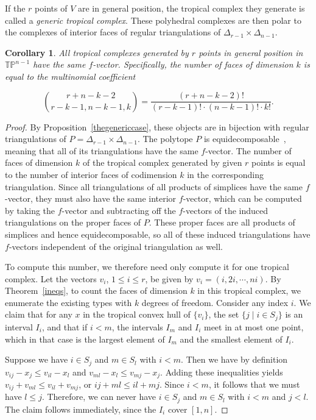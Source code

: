 \documentclass[11pt]{amsart}
\newtheorem{cor}[thm]{Corollary}
\newcommand{\TP}{\mathbb{TP}}
\newcommand{\bin}[2]{{#1\choose #2}}
\begin{document}
If the $r$ points of $V$ are in general position, the tropical complex they generate is 
called a 
\emph{generic tropical complex}.
These polyhedral complexes are then polar to the complexes of interior faces of regular
triangulations of $\Delta_{r-1}\times \Delta_{n-1}$.

\begin{cor}
All tropical complexes generated by $r$ points in general position in $\TP^{n-1}$ have the same 
$f$-vector. 
Specifically, the
number of faces of dimension $k$ is equal to the multinomial coefficient

\[
\bin{r+n-k-2}{r-k-1, n-k-1, k} = \frac{(r+n-k-2)!}{(r-k-1)!\cdot (n-k-1)!\cdot k!}.
\]
\end{cor}

\begin{proof}

By Proposition~\ref{thegenericcase}, these objects are in bijection with regular triangulations of
$P=\Delta_{r-1}\times \Delta_{n-1}$.  The polytope $P$ is equidecomposable~\cite{BCS}, meaning that all of
its triangulations have the same $f$-vector. The number of faces of dimension $k$ of the tropical complex
generated by given $r$ points is equal to the number of interior faces of codimension $k$ in the
corresponding triangulation. Since all triangulations of all products of simplices have the same
$f$-vector, they must also have the same interior $f$-vector, which can be computed by taking the
$f$-vector and subtracting off the $f$-vectors of the induced triangulations on the proper faces of $P$.
These proper faces are all products of simplices and hence equidecomposable, so all of these induced
triangulations have $f$-vectors independent of the original triangulation as well.

To compute this number, we therefore need only compute it for one tropical complex. Let the vectors
$v_i$, $1\le i\le r$, be given by $v_i = (i, 2i, \cdots, ni)$. By Theorem~\ref{ineqs}, to count the faces
of dimension $k$ in this tropical complex, we enumerate the existing types with $k$ degrees of
freedom. Consider any index $i$. We claim that for any $x$ in the tropical convex hull of $\{v_i\}$, the
set $\{j\mid i\in S_j\}$ is an interval $I_i$, and that if $i<m$, the intervals $I_m$ and $I_i$ meet in at
most one point, which in that case is the largest element of $I_m$ and the smallest element of $I_i$.

Suppose we have $i\in S_j$ and $m\in S_l$ with $i<m$. Then we have by definition $v_{ij}-x_j \le
v_{il}-x_l$ and $v_{ml}-x_l \le v_{mj}-x_j$. Adding these inequalities yields $v_{ij}+v_{ml} \le
v_{il}+v_{mj}$, or $ij+ml\le il+mj$. Since $i<m$, it follows that we must have $l\le j$. Therefore, we can
never have $i\in S_j$ and $m\in S_l$ with $i<m$ and $j<l$. The claim follows immediately, since the $I_i$
cover $[1,n]$.


\end{proof}
\end{document}
